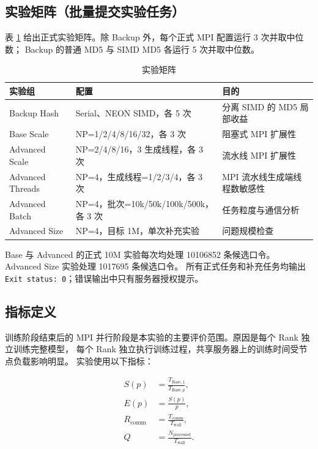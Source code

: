 \documentclass[UTF8,a4paper,12pt]{ctexart}
\newcommand{\code}[1]{\texttt{#1}}
\begin{document}
\subsection{实验矩阵（批量提交实验任务）}

表 \ref{tab:experiment-matrix} 给出正式实验矩阵。除 Backup 外，每个正式 MPI 配置运行 3 次并取中位数；
Backup 的普通 MD5 与 SIMD MD5 各运行 5 次并取中位数。

\begin{table}[H]
  \centering
  \caption{实验矩阵}
  \label{tab:experiment-matrix}
  \small
  \begin{tabular}{p{}p{}p{}}
    \toprule
    实验组 & 配置 & 目的 \\
    \midrule
    Backup Hash & Serial、NEON SIMD，各 5 次 & 分离 SIMD 的 MD5 局部收益 \\
    Base Scale & NP=1/2/4/8/16/32，各 3 次 & 阻塞式 MPI 扩展性 \\
    Advanced Scale & NP=2/4/8/16，3 生成线程，各 3 次 & 流水线 MPI 扩展性 \\
    Advanced Threads & NP=4，生成线程=1/2/3/4，各 3 次 & MPI 流水线生成端线程数敏感性 \\
    Advanced Batch & NP=4，批次=10k/50k/100k/500k，各 3 次 & 任务粒度与通信分析 \\
    Advanced Size & NP=4，目标 1M，单次补充实验 & 问题规模检查 \\
    \bottomrule
  \end{tabular}
\end{table}

Base 与 Advanced 的正式 10M 实验每次均处理 10106852 条候选口令。
Advanced Size 实验处理 1017695 条候选口令。
所有正式任务和补充任务均输出 \code{Exit status: 0}；错误输出中只有服务器授权提示。

\subsection{指标定义}

训练阶段结束后的 MPI 并行阶段是本实验的主要评价范围。原因是每个 Rank 独立训练完整模型，
每个 Rank 独立执行训练过程，共享服务器上的训练时间受节点负载影响明显。
实验使用以下指标：

\begin{align}
S(p) &= \frac{T_{\mathrm{Base},1}}{T_{\mathrm{Base},p}},\\
E(p) &= \frac{S(p)}{p},\\
R_{\mathrm{comm}} &= \frac{T_{\mathrm{comm}}}{T_{\mathrm{wall}}},\\
Q &= \frac{N_{\mathrm{processed}}}{T_{\mathrm{wall}}}.
\end{align}
\end{document}

